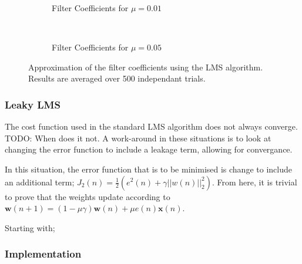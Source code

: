 \documentclass[main.tex]{subfiles}
\begin{document}
\begin{figure}[H]
	\centering
	\begin{subfigure}[b]{0.45\textwidth}
		\resizebox{\textwidth}{!}{}
		\caption{Filter Coefficients for $\mu = 0.01$}
	\end{subfigure}%
	~ %
	\begin{subfigure}[b]{0.45\textwidth}
		\resizebox{\textwidth}{!}{}
		\caption{Filter Coefficients for $\mu = 0.05$}
	\end{subfigure}
	\caption{Approximation of the filter coefficients using the LMS algorithm. Results are averaged over 500 independant trials.}
	\label{fig:animals}
\end{figure}










\subsubsection{Leaky LMS}

The cost function used in the standard LMS algorithm does not always converge. TODO: When does it not. A work-around in these situations is to look at changing the error function to include a leakage term, allowing for convergance. 

In this situation, the error function that is to be minimised is change to include an additional term; $J_2(n) = \frac{1}{2}(e^2(n) + \gamma||w(n)||^2_2)$. From here, it is trivial to prove that the weights update according to $\textbf{w}(n+1) = (1-\mu \gamma)\textbf{w}(n) + \mu e(n)\textbf{x}(n)$.

Starting with;










\subsubsection{Implementation}
\end{document}
